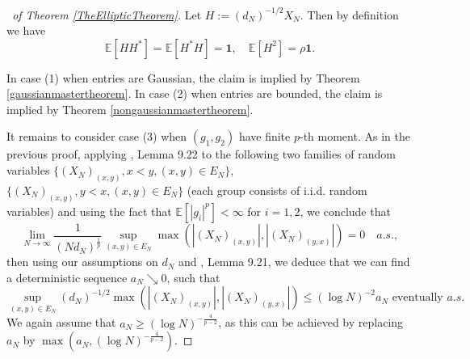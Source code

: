 \documentclass[11pt,reqno]{amsart}
\theoremstyle{plain}
\theoremstyle{remark}
\numberwithin{equation}{section}
\begin{document}
\begin{proof}[\proofname\ of Theorem \ref{TheEllipticTheorem}] 
    Let $H:=(d_N)^{-1/2}X_N$. Then by definition we have 
    $$
\mathbb{E}[HH^*]=\mathbb{E}[H^*H]=\mathbf{1},\quad \mathbb{E}[H^2]=\rho \mathbf{1}.
    $$


    
    In case (1) when entries are Gaussian, the claim is implied by Theorem \ref{gaussianmastertheorem}. In case (2) when entries are bounded, the claim is implied by Theorem \ref{nongaussianmastertheorem}.

    It remains to consider case (3) when $(g_1,g_2)$ have finite $p$-th moment. As in the previous proof, applying \cite{brailovskaya2022universality}, Lemma 9.22 to the following two families of random variables $\{(X_N)_{(x,y)},x< y,(x,y)\in E_N\}$, $\{(X_N)_{(x,y)},y< x,(x,y)\in E_N\}$  (each group consists of i.i.d. random variables) and using the fact that $\mathbb{E}[|g_i|^p]<\infty$ for $i=1,2$, we conclude that    $$
\lim_{N\to\infty}\frac{1}{(Nd_N)^\frac{1}{p}}\sup_{(x,y)\in E_N}\max\left(|(X_N)_{(x,y)}|,|(X_N)_{(y,x)}|\right)=0
   \quad a.s.,$$ then using our assumptions on $d_N$ and \cite{brailovskaya2022universality}, Lemma 9.21, we deduce that we can find a deterministic sequence $a_N\searrow 0$, such that
   \begin{equation}\label{ASSTATEMENT}
\sup_{(x,y)\in E_N}(d_N)^{-1/2}\max\left(|(X_N)_{(x,y)}|,|(X_N)_{(y,x)}|\right)\leq (\log N)^{-2}a_N\text{ eventually } a.s.
   \end{equation}
 We again assume that $a_N\geq (\log N)^{-\frac{4}{p-2}}$, as this can be achieved by replacing $a_N$ by $\max(a_N, (\log N)^{-\frac{4}{p-2}})$.



\end{proof}
\end{document}
